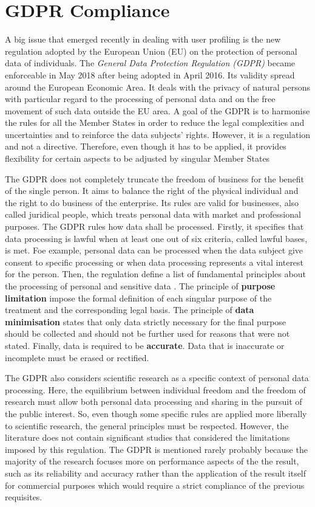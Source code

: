 \section{GDPR Compliance}
A big issue that emerged recently in dealing with user profiling is the new regulation adopted by the European Union (EU) on the protection of personal data of individuals.
The \emph{General Data Protection Regulation (GDPR)} became enforceable in May 2018 after being adopted in April 2016. Its validity spread around the European Economic Area.
It deals with the privacy of natural persons with particular regard to the processing of personal data and on the free movement of such data outside the EU area.
A goal of the GDPR is to harmonise the rules for all the Member States in order to reduce the legal complexities and uncertainties and to reinforce the data subjects' rights.
However, it is a regulation and not a directive. Therefore, even though it has to be applied, it provides flexibility for certain aspects to be adjusted by singular Member States


The GDPR does not completely truncate the freedom of business for the benefit of the single person. It aims to balance the right of the physical individual and the right to do business of the enterprise.
Its rules are valid for businesses, also called juridical people, which treats personal data with market and professional purposes.
The GDPR rules how data shall be processed. Firstly, it specifies that data processing is lawful when at least one out of six criteria, called lawful bases, is met. Foe example, personal data can be processed when the data subject give consent to specific processing or when data processing represents a vital interest for the person.
Then, the regulation define a list of fundamental principles about the processing of personal and sensitive data \cite{voigt2017eu}. The principle of \textbf{purpose limitation} impose the formal definition of each singular purpose of the treatment and the corresponding legal basis.
The principle of \textbf{data minimisation} states that only data strictly necessary for the final purpose should be collected and should not be further used for reasons that were not stated.
Finally, data is required to be \textbf{accurate}. Data that is inaccurate or incomplete must be erased or rectified.


The GDPR also considers scientific research as a specific context of personal data processing. Here, the equilibrium between individual freedom and the freedom of research must allow both personal data processing and sharing in the pursuit of the public interest. 
So, even though some specific rules are applied more liberally to scientific research, the general principles must be respected.
However, the literature does not contain significant studies that considered the limitations imposed by this regulation.
The GDPR is mentioned rarely probably because the majority of the research focuses more on performance aspects of the the result, such as its reliability and accuracy rather than the application of the result itself for commercial purposes which would require a strict compliance of the previous requisites.


